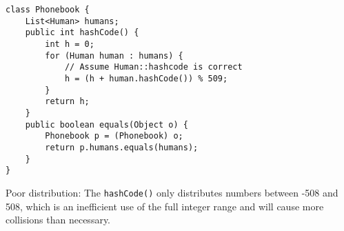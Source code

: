 \question \begin{lstlisting}
class Phonebook {
    List<Human> humans;
    public int hashCode() {
        int h = 0;
        for (Human human : humans) {
            // Assume Human::hashcode is correct
            h = (h + human.hashCode()) % 509;
        }
        return h;
    }
    public boolean equals(Object o) {
        Phonebook p = (Phonebook) o;
        return p.humans.equals(humans);
    }
}
\end{lstlisting}

\begin{solution}[0.25in]
Poor distribution: The \lstinline$hashCode()$ only distributes numbers between
-508 and 508, which is an inefficient use of the full integer range and will
cause more collisions than necessary.
\end{solution}
